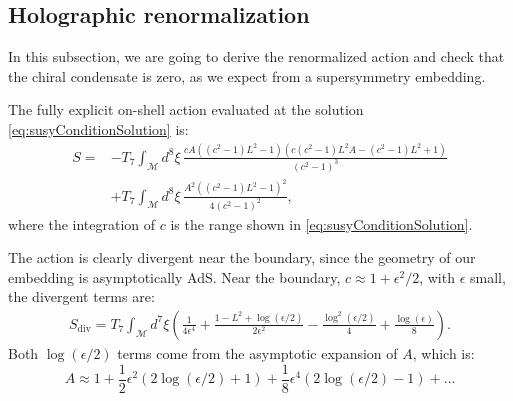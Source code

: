 \subsection{Holographic renormalization}
In this subsection, we are going to derive the renormalized action and check that the chiral condensate is zero, as we expect from a supersymmetry embedding.

The fully explicit on-shell action evaluated at the solution \eqref{eq:susyConditionSolution} is:
\begin{align}\label{eq:ActionAtSolution}
 S = & -T_7 \int_\mathcal{M} d^8\xi \, 
 \frac{c A \left(\left(c^2-1\right) L^2-1\right) \left(c \left(c^2-1\right) L^2 A-\left(c^2-1\right) L^2+1\right)}{\left(c^2-1\right)^3}
 \nonumber \\
     & +T_7\int _\mathcal{M} d^8\xi \, 
 \frac{A^2 \left(\left(c^2-1\right) L^2-1\right)^2}{4 \left(c^2-1\right)^2},
\end{align}
where the integration of $c$ is the range shown in \eqref{eq:susyConditionSolution}.

The action is clearly divergent near the boundary, since the geometry of our embedding is asymptotically AdS. Near the boundary, $c \approx 1 + \epsilon^2/2$, with $\epsilon$ small, the divergent terms are:
\begin{align}
 S_\text{div} = T_7 \int_\mathcal{M} d^7\xi 
        \left( \frac{1}{4 \epsilon ^4} +\frac{1-L^2+\log \left(\epsilon/2\right)}{2 \epsilon ^2}-\frac{ \log ^2\left(\epsilon/2\right)}{4}+\frac{\log (\epsilon )}{8} \right).
\end{align}
Both $\log(\epsilon/2)$ terms come from the asymptotic expansion of $A$, which is:
\begin{equation}
 A \approx 1 +\frac{1}{2} \epsilon^2 (2 \log (\epsilon/2)+1) + \frac{1}{8} \epsilon^4 (2 \log(\epsilon/2)-1) + \ldots
\end{equation}


